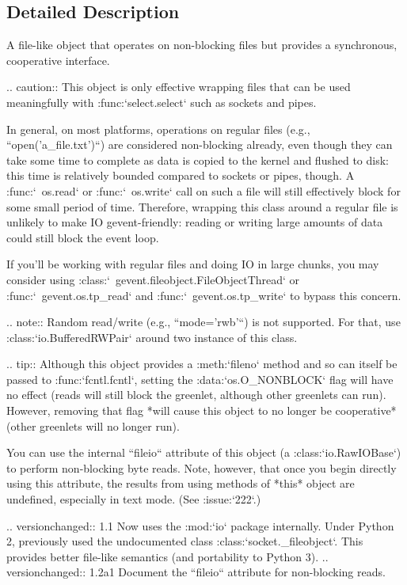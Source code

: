 \subsection{Detailed Description}
\begin{DoxyVerb}A file-like object that operates on non-blocking files but
provides a synchronous, cooperative interface.

.. caution::
     This object is only effective wrapping files that can be used meaningfully
     with :func:`select.select` such as sockets and pipes.

     In general, on most platforms, operations on regular files
     (e.g., ``open('a_file.txt')``) are considered non-blocking
     already, even though they can take some time to complete as
     data is copied to the kernel and flushed to disk: this time
     is relatively bounded compared to sockets or pipes, though.
     A :func:`~os.read` or :func:`~os.write` call on such a file
     will still effectively block for some small period of time.
     Therefore, wrapping this class around a regular file is
     unlikely to make IO gevent-friendly: reading or writing large
     amounts of data could still block the event loop.

     If you'll be working with regular files and doing IO in large
     chunks, you may consider using
     :class:`~gevent.fileobject.FileObjectThread` or
     :func:`~gevent.os.tp_read` and :func:`~gevent.os.tp_write` to bypass this
     concern.

.. note::
     Random read/write (e.g., ``mode='rwb'``) is not supported.
     For that, use :class:`io.BufferedRWPair` around two instance of this
     class.

.. tip::
     Although this object provides a :meth:`fileno` method and so
     can itself be passed to :func:`fcntl.fcntl`, setting the
     :data:`os.O_NONBLOCK` flag will have no effect (reads will
     still block the greenlet, although other greenlets can run).
     However, removing that flag *will cause this object to no
     longer be cooperative* (other greenlets will no longer run).

     You can use the internal ``fileio`` attribute of this object
     (a :class:`io.RawIOBase`) to perform non-blocking byte reads.
     Note, however, that once you begin directly using this
     attribute, the results from using methods of *this* object
     are undefined, especially in text mode. (See :issue:`222`.)

.. versionchanged:: 1.1
   Now uses the :mod:`io` package internally. Under Python 2, previously
   used the undocumented class :class:`socket._fileobject`. This provides
   better file-like semantics (and portability to Python 3).
.. versionchanged:: 1.2a1
   Document the ``fileio`` attribute for non-blocking reads.
\end{DoxyVerb}
 


